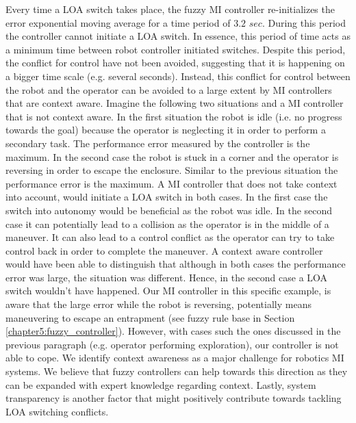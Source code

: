 \documentclass[a4paper,12pt,oneside,openright]{bhamthesis}
\begin{document}
Every time a LOA switch takes place, the fuzzy MI controller re-initializes the error exponential moving average for a time period of $3.2$ $sec$. During this period the controller cannot initiate a LOA switch. In essence, this period of time acts as a minimum time between robot controller initiated switches. Despite this period, the conflict for control have not been avoided, suggesting that it is happening on a bigger time scale (e.g. several seconds). Instead, this conflict for control between the robot and the operator can be avoided to a large extent by MI controllers that are context aware. Imagine the following two situations and a MI controller that is not context aware. In the first situation the robot is idle (i.e. no progress towards the goal) because the operator is neglecting it in order to perform a secondary task. The performance error measured by the controller is the maximum. In the second case the robot is stuck in a corner and the operator is reversing in order to escape the enclosure. Similar to the previous situation the performance error is the maximum. A MI controller that does not take context into account, would initiate a LOA switch in both cases. In the first case the switch into autonomy would be beneficial as the robot was idle. In the second case it can potentially lead to a collision as the operator is in the middle of a maneuver. It can also lead to a control conflict as the operator can try to take control back in order to complete the maneuver. A context aware controller would have been able to distinguish that although in both cases the performance error was large, the situation was different. Hence, in the second case a LOA switch wouldn't have happened. Our MI controller in this specific example, is aware that the large error while the robot is reversing, potentially means maneuvering to escape an entrapment (see fuzzy rule base in Section \ref{chapter5:fuzzy_controller}). However, with cases such the ones discussed in the previous paragraph (e.g. operator performing exploration), our controller is not able to cope. We identify context awareness as a major challenge for robotics MI systems. We believe that fuzzy controllers can help towards this direction as they can be expanded with expert knowledge regarding context. Lastly, system transparency is another factor that might positively contribute towards tackling LOA switching conflicts. 
\end{document}
